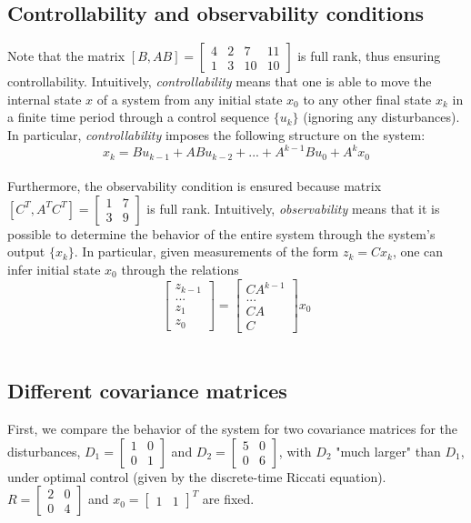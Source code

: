 \documentclass[11pt, oneside]{article}   	%
\begin{document}
\subsection{Controllability and observability conditions}
Note that the matrix $[B, AB] = \begin{bmatrix} 4 & 2 & 7 & 11 \\[0.3em] 1 & 3 & 10 & 10 \end{bmatrix}$ is full rank, thus ensuring controllability. Intuitively, \textit{controllability} means that one is able to move the internal state $x$ of a system from any initial state $x_0$ to any other final state $x_k$ in a finite time period through a control sequence $\{u_k\}$ (ignoring any disturbances). In particular, \textit{controllability} imposes the following structure on the system:
$$
x_k = B u_{k-1} + AB u_{k-2} + ... + A^{k-1}B u_{0} + A^k x_0
$$\\


Furthermore, the observability condition is ensured because matrix $[C^T, A^T C^T] = \begin{bmatrix} 1 & 7 \\[0.3em] 3 & 9 \end{bmatrix}$ is full rank. Intuitively, \textit{observability} means that it is possible to determine the behavior of the entire system through the system's output $\{x_k\}$. In particular, given measurements of the form $z_k = C x_k$, one can infer initial state $x_0$ through the relations
$$
\begin{bmatrix} z_{k-1} \\[0.3em] ... \\[0.3em] z_{1} \\[0.3em] z_{0}  \end{bmatrix} =
\begin{bmatrix} CA^{k-1} \\[0.3em] ... \\[0.3em] CA \\[0.3em] C  \end{bmatrix} x_0
$$\\


\subsection{Different covariance matrices}
First, we compare the behavior of the system for two covariance matrices for the disturbances, $D_1 = \begin{bmatrix} 1 & 0 \\[0.3em] 0 & 1 \end{bmatrix}$ and $D_2 = \begin{bmatrix} 5 & 0 \\[0.3em] 0 & 6 \end{bmatrix}$, with $D_2$ "much larger" than $D_1$, under optimal control (given by the discrete-time Riccati equation). $R = \begin{bmatrix} 2 & 0 \\[0.3em] 0 & 4 \end{bmatrix}$ and $x_0 = \begin{bmatrix} 1 & 1 \end{bmatrix}^T$ are fixed. \\
\end{document}
